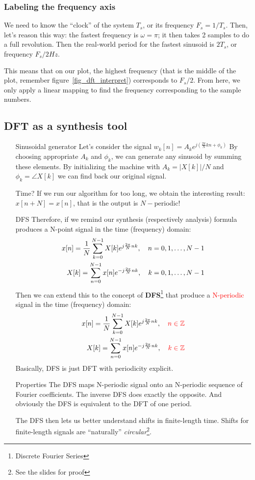 \documentclass[11pt,a4paper]{article}
\begin{document}
\subsubsection{Labeling the frequency axis}
We need to know the ``clock'' of the system $T_s$, or its frequency $F_s = 1/T_s$. Then, let's reason this way: the fastest frequency is $\omega = \pi$; it then takes 2 samples to do a full revolution. Then the real-world period for the fastest sinusoid is $2T_s$, or frequency $F_s/2 Hz$.

This means that on our plot, the highest frequency (that is the middle of the plot, remember figure\ \ref{fig_dft_interpret}) corresponds to $F_s/2$. From here, we only apply a linear mapping to find the frequency corresponding to the sample numbers.

\subsection{DFT as a synthesis tool}
\begin{itemize}
	\item[Sinusoidal generator]Let's consider the signal $w_k[n] = A_k e^{j(\frac{2 \pi}{N} k n + \phi_k)}$ By choosing appropriate $A_k$ and $\phi_k$, we can generate any sinusoid by summing these elements. By initializing the machine with $A_k = |X[k]|/N$ and $\phi_k = \angle X[k]$ we can find back our original signal.
	\item[Time?]If we run our algorithm for too long, we obtain the interesting result: $x[n+N]  =x[n]$, that is the output is $N-$periodic!

	\item[DFS]Therefore, if we remind our synthesis (respectively analysis) formula produces a N-point signal in the time (frequency) domain:
	      \begin{align}
		      x[n] = \frac{1}{N} \somme{N-1}{k=0}X[k] e^{j\frac{2\pi}{N}nk},\quad n=0,1,\ldots,N-1 \\
		      X[k] = \somme{N-1}{n=0}x[n]e^{-j\frac{2\pi}{N}nk},\quad k=0,1,\ldots,N-1
	      \end{align}
	      Then we can extend this to the concept of \textbf{DFS}\footnote{Discrete Fourier Series} that produce a \textcolor{red}{N-periodic} signal in the time (frequency) domain:
	      \begin{align}
		      x[n] = \frac{1}{N} \somme{N-1}{k=0}X[k] e^{j\frac{2\pi}{N}nk},\quad \textcolor{red}{n\in\Z} \\
		      X[k] = \somme{N-1}{n=0}x[n]e^{-j\frac{2\pi}{N}nk},\quad \textcolor{red}{k\in\Z}
	      \end{align}
	      Basically, DFS is just DFT with periodicity explicit.
	\item[Properties]The DFS maps N-periodic signal onto an N-periodic sequence of Fourier coefficients. The inverse DFS does exactly the opposite. And obviously the DFS is equivalent to the DFT of one period.

	      The DFS then lets us better understand shifts in finite-length time. Shifts for finite-length signals are ``naturally'' \textit{circular}\footnote{See the slides for proof}.
\end{itemize}
\end{document}
